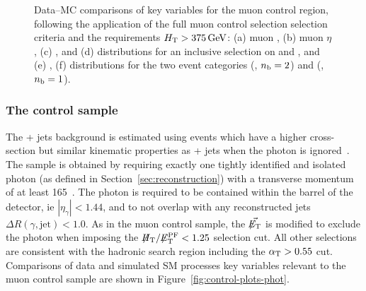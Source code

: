 \begin{figure}[h!]
%
  \caption{\label{fig:control-plots-muon} Data--MC comparisons of key
    variables for the muon control region, following the
    application of the full muon control selection selection criteria 
    and the requirements $\mbox{$H_\text{T}$} > 375\,\text{Ge\hspace{-.08em}V}$: (a) muon \pt, (b) muon $\eta$,
    (c) \nb, and (d) \scalht distributions for an inclusive 
    selection on \njet and \nb, and (e) \njet , (f) \scalht distributions for the two 
    event categories (\njethigh, $n_{\text{b}} = 2$) and (\njetlow, $n_{\text{b}} = 1$). }
\end{figure}

\subsubsection{The \texorpdfstring{\gj}{photon plus jets} control sample}

The \znunu + jets background is estimated using \gj events which
have a higher cross-section but similar kinematic properties as 
\znunu + jets when the photon is ignored~\cite{PAS-SUS-08-002,Bern:2011pa}. 
The \gj sample is obtained by requiring exactly one tightly 
identified and isolated photon (as defined in Section~\ref{sec:reconstruction})
with a transverse momentum of at least 165~\gev. The photon is required 
to be contained within the barrel of the detector, ie $|\eta_{\gamma}| <1.44$, 
and to not overlap with any reconstructed jets $\Delta R(\gamma,\textrm{jet}) < 1.0$.
As in the muon control sample, the $\mbox{$\vec{\mbox{$\not\!\!E_\text{T}$}}$}$ is modified to exclude the photon 
when imposing the $\mbox{$\not\!\!H_\text{T}$}/\mbox{$\not\!\!E_\text{T}^{\rm PF}$}<1.25$ selection cut.  All other selections are 
consistent with the hadronic search region including the $\alpha_{\text{T}} > 0.55$ cut.
Comparisons of data and simulated SM processes key variables relevant to 
the muon control sample are shown in Figure~\ref{fig:control-plots-phot}.

